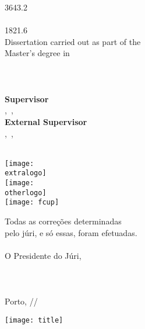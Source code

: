 \documentclass[11pt]{article}
\makeatletter
\newcommand\HUGE{\@setfontsize\Huge{36}{43.2}}
\newcommand\LargeA{\@setfontsize\Large{18}{21.6}}
\newlength{\sidew}
\makeatother
\begin{document}
\pagestyle{empty}
\setlength{\parindent}{0cm}




\hspace{25mm}
\begin{minipage}[b][297mm][t]{125mm}
	\vfill
	\parbox[b][200mm][c]{125mm}{
		\raggedright
		\setstretch{\ttlspcfront}
		{\HUGE \bfseries \frttitle} \\
		 {\large~\\}
		{\LargeA \authr \\}
		{\large Dissertation carried out as part of the  \\
		Master's degree in \degree \\}
		{\small \deptname \\ \the\year \\}
		{\small~\\}
		{\large \bfseries Supervisor \\}
		{\small \supname,~\ifdefined\suppos \suppos,~\fi \supaffil \\}
		\ifdefined\cosupaffilnolink
		{\large \bfseries External Supervisor \\}
		{\small \cosupname,~\ifdefined\cosuppos \cosuppos,~\fi \cosupaffil \\}
		\fi
		{\small~\\}
	}
	\vspace{5mm}
\end{minipage}
\hfill

\newpage






\raggedleft
\begin{minipage}[b][297mm][b]{\sidew}
	\ifdefined\extraaffilnolink
		\texttt{[image: \\extralogo]}
		\\[2mm]
	\fi
	\ifdefined\otheraffilnolink
		\texttt{[image: \\otherlogo]}
		\\[2mm]
	\fi
	\texttt{[image: fcup]}

	{ \noindent\footnotesize Todas as correções determinadas \\
		pelo júri, e só essas, foram efetuadas. \\
		\\
		O Presidente do Júri, \\
		\\
		\\
		\\
		Porto, \underline{\qquad\quad}/\underline{\quad\qquad}/\underline{\qquad\qquad} \\
	}

	\texttt{[image: title]}
\end{minipage}
\end{document}
